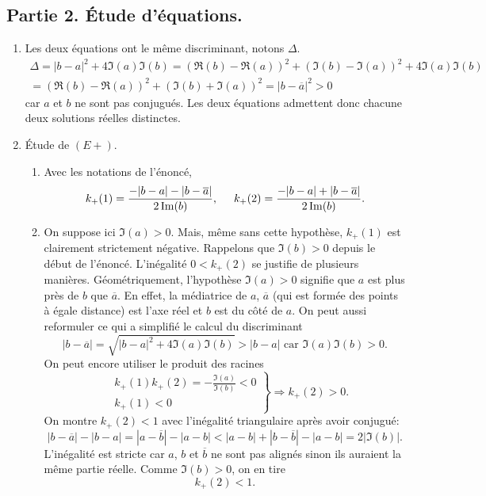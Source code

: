 \subsection*{Partie 2. \'Etude d'équations.}
\begin{enumerate}
  \item Les deux équations ont le même discriminant, notons $\Delta$.
\begin{multline*}
\Delta = |b-a|^2 + 4 \Im(a) \Im(b)=
(\Re(b)-\Re(a))^2 + (\Im(b)-\Im(a))^2 + 4 \Im(a) \Im(b)\\
= (\Re(b)-\Re(a))^2 + (\Im(b)+\Im(a))^2 = |b-\overline{a}|^2> 0
\end{multline*}
car $a$ et $b$ ne sont pas conjugués. Les deux équations admettent donc chacune deux solutions réelles distinctes. 

  \item \'Etude de $(E+)$.
\begin{enumerate}
  \item Avec les notations de l'énoncé,
\begin{displaymath}
  k_+(1) = \frac{-|b-a|-|b-\overline{a}|}{2\Im(b)}, \hspace{0.5cm}   k_+(2) = \frac{-|b-a|+|b-\overline{a}|}{2\Im(b)}.
\end{displaymath}

  \item On suppose ici $\Im(a)>0$. Mais, même sans cette hypothèse, $k_+(1)$ est clairement strictement négative. Rappelons que $\Im(b)>0$ depuis le début de l'énoncé.\newline
L'inégalité $0<k_+(2)$ se justifie de plusieurs manières.\newline
Géométriquement, l'hypothèse $\Im(a)>0$ signifie que $a$ est plus près de $b$ que $\overline{a}$. En effet, la médiatrice de $a$, $\overline{a}$ (qui est formée des points à égale distance) est l'axe réel et $b$ est du côté de $a$.\newline
On peut aussi reformuler ce qui a simplifié le calcul du discriminant
\begin{displaymath}
|b-\overline{a}| = \sqrt{|b-a|^2 + 4\Im(a)\Im(b)}> |b-a|\text{ car } \Im(a)\Im(b)>0 . 
\end{displaymath}
On peut encore utiliser le produit des racines
\begin{displaymath}
\left. 
\begin{aligned}
  &k_+(1)k_+(2) = -\frac{\Im(a)}{\Im(b)}<0 \\ &k_+(1)<0
\end{aligned}
\right\rbrace \Rightarrow k_+(2)>0.
\end{displaymath}
On montre $k_+(2)<1$ avec l'inégalité triangulaire après avoir conjugué:
\begin{displaymath}
  |b-\overline{a}| -|b-a| = |a-\overline{b}| -|a-b| < |a-b| + |b-\overline{b}| -|a-b|=2|\Im(b)|. 
\end{displaymath}
L'inégalité est stricte car $a$, $b$ et $\overline{b}$ ne sont pas alignés sinon ils auraient la même partie réelle. Comme $\Im(b)>0$, on en tire
\begin{displaymath}
  k_+(2) < 1.
\end{displaymath}


\end{enumerate}
\end{enumerate}
